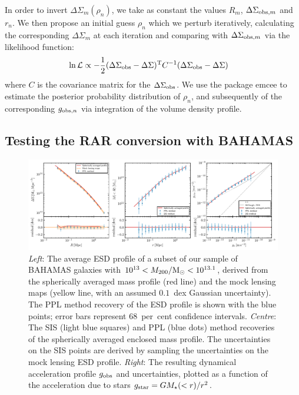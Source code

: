 \documentclass[usenatbib]{mnras}
\newcommand{\un}[1]{_{\rm #1}}
\begin{document}
In order to invert $\Delta\Sigma_m(\rho_n)$, we take as constant the values $R_m$, $\Delta\Sigma_{{\rm obs},m}$ and $r_{n}$. We then propose an initial guess $\rho_n$ which we perturb iteratively, calculating the corresponding $\Delta\Sigma_m$ at each iteration and comparing with $\Delta\Sigma_{{\rm obs},m}$ via the likelihood function:
\begin{align}
	\ln\mathcal{L} &\propto -\frac{1}{2}(\Delta\Sigma\un{obs}-\Delta\Sigma)^{\rm T}C^{-1}(\Delta\Sigma\un{obs}-\Delta\Sigma)
\end{align}
where $C$ is the covariance matrix for the $\Delta\Sigma\un{obs}$. We use the package {\sc emcee} \citep{foreman-mackey13} to estimate the posterior probability distribution of $\rho_n$, and subsequently of the corresponding $g_{{\rm obs},n}$ via integration of the volume density profile.


\subsection{Testing the RAR conversion with BAHAMAS}
\label{sec:conversion_test}

\begin{figure}
	\includegraphics[width=\textwidth]{Figures/compare_method}
	\caption{\emph{Left}: The average ESD profile of a subset of our sample of BAHAMAS galaxies with $10^{13}<M_{200}/{\rm M}_\odot<10^{13.1}$, derived from the spherically averaged mass profile (red line) and the mock lensing maps (yellow line, with an assumed $0.1$~dex Gaussian uncertainty). The PPL method recovery of the ESD profile is shown with the blue points; error bars represent 68~per~cent confidence intervals. \emph{Centre}: The SIS (light blue squares) and PPL (blue dots) method recoveries of the spherically averaged enclosed mass profile. The uncertainties on the SIS points are derived by sampling the uncertainties on the mock lensing ESD profile. \emph{Right}: The resulting dynamical acceleration profile $g_{\rm obs}$ and uncertainties, plotted as a function of the acceleration due to stars $g_{\rm star}=GM_\star(<r)/r^2$.}
	\label{fig:compare_method}
\end{figure}
\end{document}
